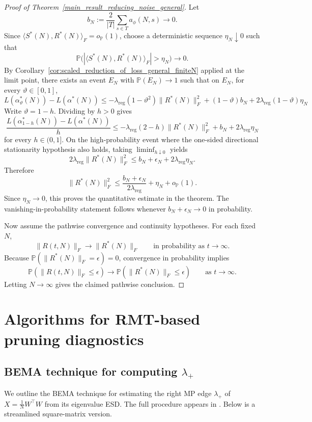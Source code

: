 \documentclass[11pt]{article}
\theoremstyle{plain}
\theoremstyle{definition}
\theoremstyle{remark}
\newcommand{\PP}{\mathbb{P}}
\newcommand{\1}{\mathbf{1}}
\begin{document}
\begin{proof}[Proof of Theorem~\ref{main_result_reducing_noise_general}]
Let
\[
b_N:=\frac{2}{|T|}\sum_{s\in T}a_\phi(N,s)\to0.
\]
Since \(\langle S^*(N),R^*(N)\rangle_F=o_{\PP}(1)\), choose a deterministic sequence \(\eta_N\downarrow0\) such that
\[
\PP\big(|\langle S^*(N),R^*(N)\rangle_F|>\eta_N\big)\to0.
\]
By Corollary~\ref{cor:scaled_reduction_of_loss_general_finiteN} applied at the limit point, there exists an event \(E_N\) with \(\PP(E_N)\to1\) such that on \(E_N\), for every \(\vartheta\in[0,1]\),
\[
L(\alpha_\vartheta^*(N))-L(\alpha^*(N))
\le
-\lambda_{\mathrm{reg}}(1-\vartheta^2)\|R^*(N)\|_F^2
+(1-\vartheta)b_N
+2\lambda_{\mathrm{reg}}(1-\vartheta)\eta_N
\]
Write \(\vartheta=1-h\). Dividing by \(h>0\) gives
\[
\frac{L(\alpha_{1-h}^*(N))-L(\alpha^*(N))}{h}
\le
-\lambda_{\mathrm{reg}}(2-h)\|R^*(N)\|_F^2
+b_N
+2\lambda_{\mathrm{reg}}\eta_N
\]
for every \(h\in(0,1]\). On the high-probability event where the one-sided directional stationarity hypothesis also holds, taking \(\liminf_{h\downarrow0}\) yields
\[
2\lambda_{\mathrm{reg}}\|R^*(N)\|_F^2
\le
b_N+\epsilon_N+2\lambda_{\mathrm{reg}}\eta_N.
\]
Therefore
\[
\|R^*(N)\|_F^2
\le
\frac{b_N+\epsilon_N}{2\lambda_{\mathrm{reg}}}+\eta_N
+o_{\PP}(1).
\]
Since \(\eta_N\to0\), this proves the quantitative estimate in the theorem. The vanishing-in-probability statement follows whenever \(b_N+\epsilon_N\to0\) in probability.

Now assume the pathwise convergence and continuity hypotheses. For each fixed \(N\),
\[
\|R(t,N)\|_F\to \|R^*(N)\|_F
\qquad\text{in probability as }t\to\infty.
\]
Because \(\PP(\|R^*(N)\|_F=\epsilon)=0\), convergence in probability implies
\[
\PP(\|R(t,N)\|_F\le \epsilon)\to \PP(\|R^*(N)\|_F\le \epsilon)
\qquad\text{as }t\to\infty.
\]
Letting \(N\to\infty\) gives the claimed pathwise conclusion.
\end{proof}

\section{Algorithms for RMT-based pruning diagnostics}
\label{numerics_updated}

\subsection{BEMA technique for computing \texorpdfstring{\(\lambda_+\)}{lambda+}}
\label{finding_lambda_updated}

We outline the BEMA technique for estimating the right MP edge \(\lambda_+\) of \(X=\frac1N W^\top W\) from its eigenvalue ESD. The full procedure appears in \cite{ke2021estimation}. Below is a streamlined square-matrix version.
\end{document}
